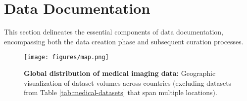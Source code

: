 \section{Data Documentation}

This section delineates the essential components of data documentation, encompassing both the data creation phase and subsequent curation processes.

\begin{figure*}[h]
    \centering
    \texttt{[image: figures/map.png]}
    \caption{\textbf{Global distribution of medical imaging data:} Geographic visualization of dataset volumes across countries (excluding datasets from Table \ref{tab:medical-datasets} that span multiple locations).}
    \label{fig:map}
\end{figure*}

